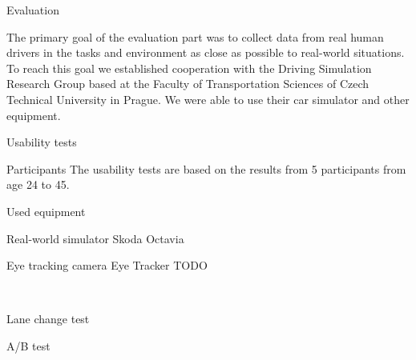\chap Evaluation

The primary goal of the evaluation part was to collect data from real human drivers in the tasks and environment as close as possible to real-world situations. To reach this goal we established cooperation with the Driving Simulation Research Group based at the Faculty of Transportation Sciences of Czech Technical University in Prague. We were able to use their car simulator and other equipment.

\sec Usability tests

\secc Participants
The usability tests are based on the results from 5 participants from age 24 to 45.

\secc Used equipment


Real-world simulator Skoda Octavia

Eye tracking camera Eye Tracker TODO

\

\sec Lane change test

\sec A/B test





